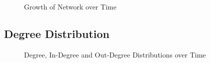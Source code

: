 \documentclass[10pt]{article}
\begin{document}
\begin{multicols}{2}
\begin{figure}
\caption{Growth of Network over Time \label{fig:growth}}
\end{figure}

\subsection{Degree Distribution}
\begin{figure}
\caption{Degree, In-Degree and Out-Degree Distributions over Time \label{fig:degree}}
\end{figure}



\end{multicols}
\end{document}
